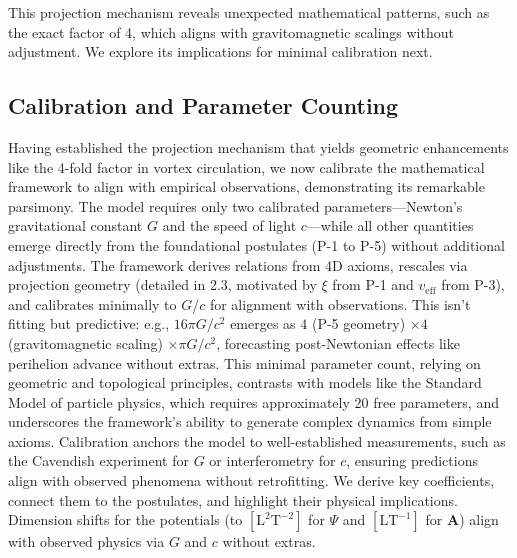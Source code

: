 \medskip
\noindent
{}
\medskip

This projection mechanism reveals unexpected mathematical patterns, such as the exact factor of 4, which aligns with gravitomagnetic scalings without adjustment. We explore its implications for minimal calibration next.

\subsection{Calibration and Parameter Counting}

Having established the projection mechanism that yields geometric enhancements like the 4-fold factor in vortex circulation, we now calibrate the mathematical framework to align with empirical observations, demonstrating its remarkable parsimony. The model requires only two calibrated parameters---Newton's gravitational constant $G$ and the speed of light $c$---while all other quantities emerge directly from the foundational postulates (P-1 to P-5) without additional adjustments. The framework derives relations from 4D axioms, rescales via projection geometry (detailed in 2.3, motivated by $\xi$ from P-1 and $v_{\text{eff}}$ from P-3), and calibrates minimally to $G$/$c$ for alignment with observations. This isn't fitting but predictive: e.g., $16\pi G/c^2$ emerges as $4$ (P-5 geometry) $\times 4$ (gravitomagnetic scaling) $\times \pi G/c^2$, forecasting post-Newtonian effects like perihelion advance without extras. This minimal parameter count, relying on geometric and topological principles, contrasts with models like the Standard Model of particle physics, which requires approximately 20 free parameters, and underscores the framework's ability to generate complex dynamics from simple axioms. Calibration anchors the model to well-established measurements, such as the Cavendish experiment for $G$ or interferometry for $c$, ensuring predictions align with observed phenomena without retrofitting. We derive key coefficients, connect them to the postulates, and highlight their physical implications. Dimension shifts for the potentials (to $[\mathrm{L}^2 \mathrm{T}^{-2}]$ for $\Psi$ and $[\mathrm{L} \mathrm{T}^{-1}]$ for $\mathbf{A}$) align with observed physics via $G$ and $c$ without extras.


